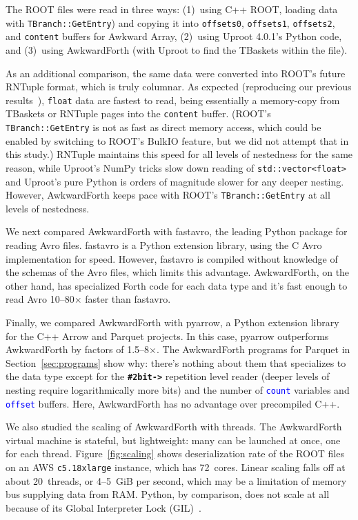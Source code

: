 \documentclass{webofc}
\begin{document}
The ROOT files were read in three ways: (1)~using C++ ROOT, loading data with \texttt{TBranch::GetEntry}) and copying it into \texttt{offsets0}, \texttt{offsets1}, \texttt{offsets2}, and \texttt{content} buffers for Awkward Array, (2)~using Uproot 4.0.1's Python code, and (3)~using AwkwardForth (with Uproot to find the TBaskets within the file).

\noindent As an additional comparison, the same data were converted into ROOT's future RNTuple format, which is truly columnar. As expected (reproducing our previous results~\cite{chep2019}), \texttt{float} data are fastest to read, being essentially a memory-copy from TBaskets or RNTuple pages into the \texttt{content} buffer. (ROOT's \texttt{TBranch::GetEntry} is not as fast as direct memory access, which could be enabled by switching to ROOT's BulkIO feature, but we did not attempt that in this study.) RNTuple maintains this speed for all levels of nestedness for the same reason, while Uproot's NumPy tricks slow down reading of \texttt{std::vector<float>} and Uproot's pure Python is orders of magnitude slower for any deeper nesting. However, AwkwardForth keeps pace with ROOT's \texttt{TBranch::GetEntry} at all levels of nestedness.

We next compared AwkwardForth with fastavro, the leading Python package for reading Avro files. fastavro is a Python extension library, using the C Avro implementation for speed. However, fastavro is compiled without knowledge of the schemas of the Avro files, which limits this advantage. AwkwardForth, on the other hand, has specialized Forth code for each data type and it's fast enough to read Avro 10--80$\times$ faster than fastavro.

Finally, we compared AwkwardForth with pyarrow, a Python extension library for the C++ Arrow and Parquet projects. In this case, pyarrow outperforms AwkwardForth by factors of 1.5--8$\times$. The AwkwardForth programs for Parquet in Section~\ref{sec:programs} show why: there's nothing about them that specializes to the data type except for the \textcolor{OliveGreen}{\tt\textbf{\#2bit->}} repetition level reader (deeper levels of nesting require logarithmically more bits) and the number of \textcolor{blue}{\tt count} variables and \textcolor{blue}{\tt offset} buffers. Here, AwkwardForth has no advantage over precompiled C++.

We also studied the scaling of AwkwardForth with threads. The AwkwardForth virtual machine is stateful, but lightweight: many can be launched at once, one for each thread. Figure~\ref{fig:scaling} shows deserialization rate of the ROOT files on an AWS {\tt c5.18xlarge} instance, which has 72~cores. Linear scaling falls off at about 20~threads, or 4--5~GiB per second, which may be a limitation of memory bus supplying data from RAM. Python, by comparison, does not scale at all because of its Global Interpreter Lock (GIL)~\cite{python-gil}.
\end{document}
